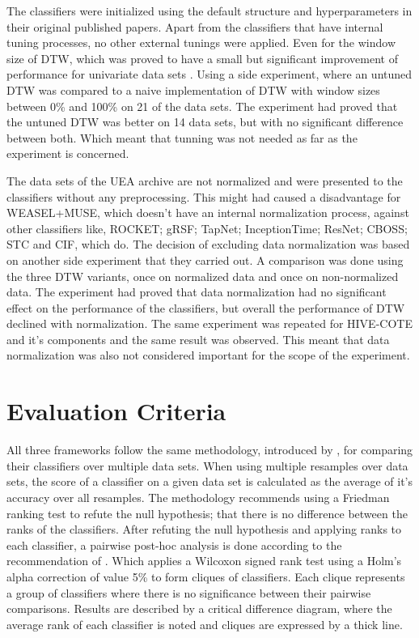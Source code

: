 The classifiers were initialized using the default structure and hyperparameters in their original published papers.
Apart from the classifiers that have internal tuning processes, no other external tunings were applied.
Even for the window size of DTW, which was proved to have a small but significant improvement of performance for univariate data sets \cite{ratanamahatana2005three}.
Using a side experiment, where an untuned DTW was compared to a naive implementation of DTW with window sizes between 0\% and 100\% on 21 of the data sets.
The experiment had proved that the untuned DTW was better on 14 data sets, but with no significant difference between both.
Which meant that tunning was not needed as far as the experiment is concerned.

The data sets of the UEA archive are not normalized and were presented to the classifiers without any preprocessing.
This might had caused a disadvantage for WEASEL+MUSE, which doesn't have an internal normalization process, against other classifiers like,
ROCKET; gRSF; TapNet; InceptionTime; ResNet; CBOSS; STC and CIF, which do.
The decision of excluding data normalization was based on another side experiment that they carried out.
A comparison was done using the three DTW variants, once on normalized data and once on non-normalized data.
The experiment had proved that data normalization had no significant effect on the performance of the classifiers, but overall the performance of DTW declined with normalization.
The same experiment was repeated for HIVE-COTE and it's components and the same result was observed.
This meant that data normalization was also not considered important for the scope of the experiment.

\section{Evaluation Criteria}
\label{ReviewsEvaluation}
All three frameworks follow the same methodology, introduced by \cite{demvsar2006statistical}, for comparing their classifiers over multiple data sets.
When using multiple resamples over data sets, the score of a classifier on a given data set is calculated as the average of it's accuracy over all resamples.
The methodology recommends using a Friedman ranking test to refute the null hypothesis; that there is no difference between the ranks of the classifiers.
After refuting the null hypothesis and applying ranks to each classifier, a pairwise post-hoc analysis is done according to the recommendation of \cite{benavoli2016should}.
Which applies a Wilcoxon signed rank test using a Holm's alpha correction of value 5\% to form cliques of classifiers.
Each clique represents a group of classifiers where there is no significance between their pairwise comparisons.
Results are described by a critical difference diagram, where the average rank of each classifier is noted and cliques are expressed by a thick line.